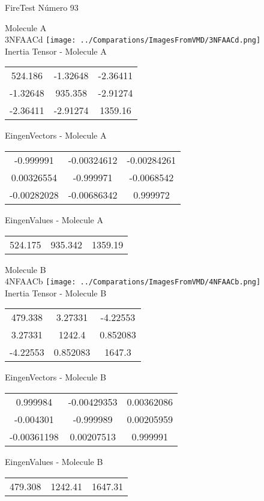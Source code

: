 \vtab[-2cm]
\begin{center}
{\large FireTest \tab Número 93}
\end{center}
\begin{multicols}{2}
\begin{center}

Molecule A \\ 
3NFAACd
\texttt{[image: ../Comparations/ImagesFromVMD/3NFAACd.png]}
\\
Inertia Tensor - Molecule A \\
\vtab

\begin{tabular}{|c c c|}
524.186	 & 	-1.32648	 & 	-2.36411	 \\
-1.32648	 & 	935.358	 & 	-2.91274	 \\
-2.36411	 & 	-2.91274	 & 	1359.16
\end{tabular}

\vtab
 EingenVectors - Molecule A     \\
\vtab
\begin{tabular}{|c c c|}
-0.999991	 & 	-0.00324612	 & 	-0.00284261	 \\
0.00326554	 & 	-0.999971	 & 	-0.0068542	 \\
-0.00282028	 & 	-0.00686342	 & 	0.999972
\end{tabular}

\vtab
 EingenValues - Molecule A     \\
\vtab
\begin{tabular}{|c c c|}
524.175	 & 	935.342	 & 	1359.19	 \\
\end{tabular}
\columnbreak

Molecule B \\ 
4NFAACb
\texttt{[image: ../Comparations/ImagesFromVMD/4NFAACb.png]}
\\
Inertia Tensor - Molecule B \\
\vtab

\begin{tabular}{|c c c|}
479.338	 & 	3.27331	 & 	-4.22553	 \\
3.27331	 & 	1242.4	 & 	0.852083	 \\
-4.22553	 & 	0.852083	 & 	1647.3
\end{tabular}

\vtab
 EingenVectors - Molecule B     \\
\vtab
\begin{tabular}{|c c c|}
0.999984	 & 	-0.00429353	 & 	0.00362086	 \\
-0.004301	 & 	-0.999989	 & 	0.00205959	 \\
-0.00361198	 & 	0.00207513	 & 	0.999991
\end{tabular}

\vtab
 EingenValues - Molecule B     \\
\vtab
\begin{tabular}{|c c c|}
479.308	 & 	1242.41	 & 	1647.31	 \\
\end{tabular}

\end{center}
\end{multicols}
